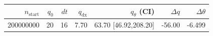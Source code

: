 \begin{tabular}{r r r r r r r}
\hline
$n_{\mathrm{start}}$ & $q_0$ & $dt$ & $q_{\mathrm{dx}}$ & $q_{\theta}$ (CI) & $\Delta q$ & $\Delta\theta$ \\
\hline
200000000 & 20 & 16 & 7.70 & 63.70 [46.92,208.20] & -56.00 & -6.499 \\
\hline
\end{tabular}
